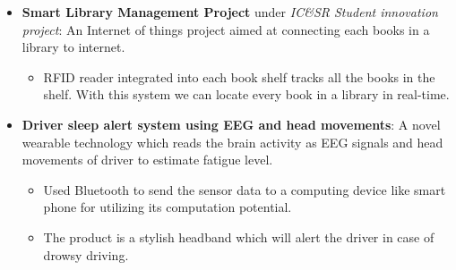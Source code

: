 \documentclass[a4paper,10pt]{article}
\begin{document}
\begin{itemize}
        \vspace{-5pt}
        \item \textbf{Smart Library Management Project} under \textit{IC\&SR Student innovation project}: An Internet of things project aimed at connecting each books in a library to internet.
        \vspace{-5pt}
        \begin{itemize}
            \setlength{\itemsep}{1pt}
            \item RFID reader integrated into each book shelf tracks all the books in the shelf. With this system we can locate every book in a library in real-time.
        \end{itemize}
        \vspace{-5pt}
        \item \textbf{Driver sleep alert system using EEG and head movements}: A novel wearable technology which reads the brain activity as EEG signals and head movements of driver to estimate fatigue level.
        \vspace{-5pt}
        \begin{itemize}
            \item Used Bluetooth to send the sensor data to a computing device like smart phone for utilizing its computation potential.
            \item The product is a stylish headband which will alert the driver in case of drowsy driving. 
        \end{itemize}                    

    \end{itemize}
\end{document}
